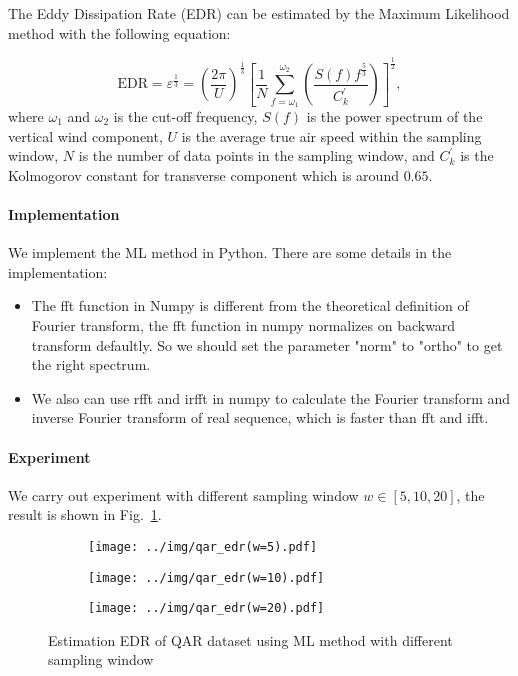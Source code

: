 \documentclass[runningheads]{llncs}
\begin{document}
The Eddy Dissipation Rate (EDR) can be estimated by the Maximum Likelihood method with the following equation:

\begin{equation}
    \mbox{EDR}=\varepsilon^{\frac13}=\left(\frac{2\pi}{U}\right)^{\frac13}\left[\frac1N \sum_{f=\omega_1}^{\omega_2}\left(\frac{S(f)f^{\frac53}}{C^{'}_k}\right)\right]^{\frac12},
\end{equation}
where $\omega_1$ and $\omega_2$ is the cut-off frequency, $S(f)$ is the power spectrum of the vertical wind component, $U$ is the average true air speed within the sampling window, $N$ is the number of data points in the sampling window, and $C^{'}_k$ is the Kolmogorov constant for transverse component which is around $0.65$.

\paragraph{Implementation}

We implement the ML method in Python. There are some details in the implementation:

\begin{itemize}
    \item The fft function in Numpy\cite{fft} is different from the theoretical definition of Fourier transform, the fft function in numpy normalizes on backward transform defaultly. 
    So we should set the parameter "norm" to "ortho" to get the right spectrum.
    \item We also can use rfft and irfft in numpy to calculate the Fourier transform and inverse Fourier transform of real sequence, which is faster than fft and ifft.
\end{itemize}

\paragraph{Experiment}

We carry out experiment with different sampling window $w \in [5,10,20]$, the result is shown in Fig.~\ref{fig:2}.

\begin{figure}[!htbp]
    \centering
    \begin{subfigure}{.4\textwidth}
        \centering
        \texttt{[image: ../img/qar\_edr(w=5).pdf]}
    \end{subfigure}
    \begin{subfigure}{.4\textwidth}
        \centering
        \texttt{[image: ../img/qar\_edr(w=10).pdf]}
    \end{subfigure}
    \begin{subfigure}{.4\textwidth}
        \centering
        \texttt{[image: ../img/qar\_edr(w=20).pdf]}
    \end{subfigure}
    \caption{Estimation EDR of QAR dataset using ML method with different sampling window}
    \label{fig:2}
\end{figure}
\end{document}
